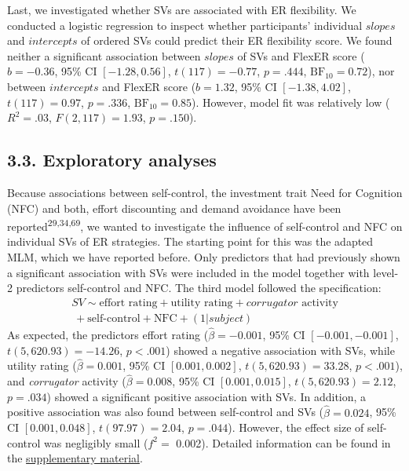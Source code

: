 \documentclass[
  man,floatsintext]{apa6}
\begin{document}
Last, we investigated whether SVs are associated with ER flexibility.
We conducted a logistic regression to inspect whether participants' individual \(slopes\) and \(intercepts\) of ordered SVs could predict their ER flexibility score.
We found neither a significant association between \(slopes\) of SVs and FlexER score (\(b = -0.36\), 95\% CI \([-1.28, 0.56]\), \(t(117) = -0.77\), \(p = .444\), \(\mathrm{BF}_{\textrm{10}} = 0.72\)), nor between \(intercepts\) and FlexER score (\(b = 1.32\), 95\% CI \([-1.38, 4.02]\), \(t(117) = 0.97\), \(p = .336\), \(\mathrm{BF}_{\textrm{10}} = 0.85\)).
However, model fit was relatively low (\(R^2 = .03\), \(F(2, 117) = 1.93\), \(p = .150\)).

\hypertarget{exploratory-analyses}{%
\subsection{3.3. Exploratory analyses}\label{exploratory-analyses}}

Because associations between self-control, the investment trait Need for Cognition (NFC) and both, effort discounting and demand avoidance have been reported\textsuperscript{29,34,69}, we wanted to investigate the influence of self-control and NFC on individual SVs of ER strategies.
The starting point for this was the adapted MLM, which we have reported before.
Only predictors that had previously shown a significant association with SVs were included in the model together with level-2 predictors self-control and NFC.
The third model followed the specification:
\[
\begin{split}
SV \sim \text{effort rating} + \text{utility rating} + corrugator \text{ activity} \\\ + \text{self-control} + \text{NFC} + (1 |subject)
\end{split}
\]
As expected, the predictors effort rating (\(\hat{\beta} = -0.001\), 95\% CI \([-0.001, -0.001]\), \(t(5,620.93) = -14.26\), \(p < .001\)) showed a negative association with SVs, while utility rating (\(\hat{\beta} = 0.001\), 95\% CI \([0.001, 0.002]\), \(t(5,620.93) = 33.28\), \(p < .001\)), and \emph{corrugator} activity (\(\hat{\beta} = 0.008\), 95\% CI \([0.001, 0.015]\), \(t(5,620.93) = 2.12\), \(p = .034\)) showed a significant positive association with SVs.
In addition, a positive association was also found between self-control and SVs (\(\hat{\beta} = 0.024\), 95\% CI \([0.001, 0.048]\), \(t(97.97) = 2.04\), \(p = .044\)).
However, the effect size of self-control was negligibly small (\(f^{2}=\) 0.002).
Detailed information can be found in the \protect\hyperlink{SupplementExploratory}{supplementary material}.
\end{document}
